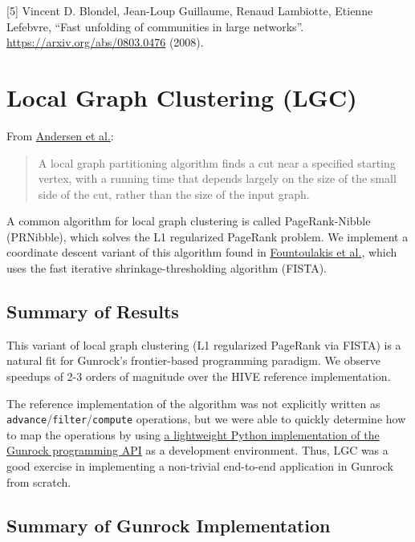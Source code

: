 \documentclass[10pt,oneside]{memoir}
\begin{document}
{[}5{]} Vincent D. Blondel, Jean-Loup Guillaume, Renaud Lambiotte,
Etienne Lefebvre, ``Fast unfolding of communities in large networks''.
\url{https://arxiv.org/abs/0803.0476} (2008).

\hypertarget{local-graph-clustering-lgc-1}{%
\chapter{Local Graph Clustering
(LGC)}\label{local-graph-clustering-lgc-1}}

From \href{https://projecteuclid.org/euclid.im/1243430567}{Andersen et
al.}:

\begin{quote}
A local graph partitioning algorithm finds a cut near a specified
starting vertex, with a running time that depends largely on the size of
the small side of the cut, rather than the size of the input graph.
\end{quote}

A common algorithm for local graph clustering is called PageRank-Nibble
(PRNibble), which solves the L1 regularized PageRank problem. We
implement a coordinate descent variant of this algorithm found in
\href{https://arxiv.org/pdf/1602.01886.pdf}{Fountoulakis et al.}, which
uses the fast iterative shrinkage-thresholding algorithm (FISTA).

\hypertarget{summary-of-results-5}{%
\section{Summary of Results}\label{summary-of-results-5}}

This variant of local graph clustering (L1 regularized PageRank via
FISTA) is a natural fit for Gunrock's frontier-based programming
paradigm. We observe speedups of 2-3 orders of magnitude over the HIVE
reference implementation.

The reference implementation of the algorithm was not explicitly written
as \texttt{advance}/\texttt{filter}/\texttt{compute} operations, but we
were able to quickly determine how to map the operations by using
\href{https://github.com/gunrock/pygunrock/blob/master/apps/pr_nibble.py}{a
lightweight Python implementation of the Gunrock programming API} as a
development environment. Thus, LGC was a good exercise in implementing a
non-trivial end-to-end application in Gunrock from scratch.

\hypertarget{summary-of-gunrock-implementation-4}{%
\section{Summary of Gunrock
Implementation}\label{summary-of-gunrock-implementation-4}}
\end{document}
